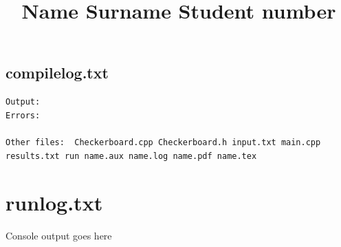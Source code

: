 \documentclass[9pt]{article}%
\title{Name Surname Student number}
\author{}
\begin{document}
%



\maketitle

\subsection*{compile\textunderscore log.txt}



\noindent\begin{lstlisting}[style=cmdoutput,numbers=none]
Output:
Errors:

Other files:  Checkerboard.cpp Checkerboard.h input.txt main.cpp results.txt run name.aux name.log name.pdf name.tex
\end{lstlisting}
\section*{run\textunderscore log.txt}
Console output goes here
\end{document}
